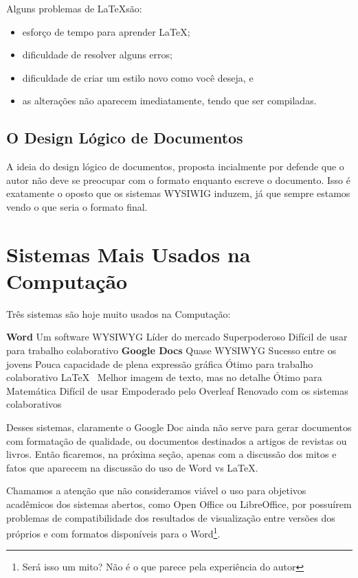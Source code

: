 Alguns problemas de \LaTeX  são:
\begin{itemize}
    \item esforço de tempo para aprender \LaTeX;
    \item dificuldade de resolver alguns erros;
    \item dificuldade de criar um estilo novo como você deseja, e
    \item as alterações não aparecem imediatamente, tendo que ser compiladas.
\end{itemize}


\subsection{O Design Lógico de Documentos}

A ideia do design lógico de documentos, proposta incialmente por \textcite{Reid:1980} defende que o autor não deve se preocupar
com o formato enquanto escreve o documento. Isso é exatamente o 
oposto que os sistemas WYSIWIG induzem, já que sempre estamos
vendo o que seria o formato final. 

\section{Sistemas Mais Usados na Computação}

Três sistemas são hoje muito usados na Computação:
    \begin{outline}
    \1 \textbf{Word}
    \2 Um software WYSIWYG
    \2 Líder do mercado
    \2 Superpoderoso
    \2 Difícil de usar para trabalho colaborativo
    \1 \textbf{Google Docs}
    \2 Quase WYSIWYG
    \2 Sucesso entre os  jovens
    \2 Pouca capacidade de plena expressão gráfica
    \2 Ótimo para trabalho colaborativo
    \1 \LaTeX\
    \2 Melhor imagem de texto, mas no detalhe
    \2 Ótimo para Matemática
    \2 Difícil de usar
    \2 Empoderado pelo Overleaf
    \2 Renovado com os sistemas colaborativos
\end{outline}

Desses sistemas, claramente o Google Doc ainda não serve para gerar documentos com formatação de qualidade, ou documentos destinados a artigos de revistas ou livros. Então ficaremos, na próxima seção, apenas com a discussão dos mitos e fatos que aparecem na discussão do uso de Word vs \LaTeX.

Chamamos a atenção que não consideramos viável o uso para objetivos acadêmicos dos sistemas abertos, como Open Office ou LibreOffice, por possuírem problemas de compatibilidade dos resultados de visualização entre versões dos próprios e com formatos disponíveis para o Word\footnote{Será isso um mito? Não é o que parece pela experiência do autor}.

